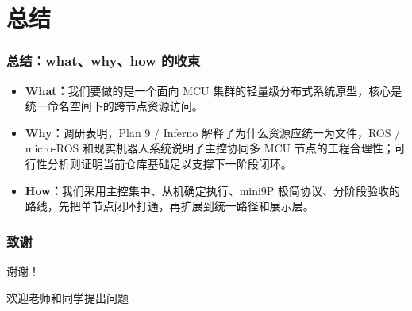 \documentclass[aspectratio=169]{ctexbeamer}
\begin{document}
\section{总结}

\begin{frame}
  \frametitle{总结：what、why、how 的收束}
  \begin{itemize}
    \item \textbf{What：}我们要做的是一个面向 MCU 集群的轻量级分布式系统原型，核心是统一命名空间下的跨节点资源访问。
    \item \textbf{Why：}调研表明，Plan 9 / Inferno 解释了为什么资源应统一为文件，ROS / micro-ROS 和现实机器人系统说明了主控协同多 MCU 节点的工程合理性；可行性分析则证明当前仓库基础足以支撑下一阶段闭环。
    \item \textbf{How：}我们采用主控集中、从机确定执行、mini9P 极简协议、分阶段验收的路线，先把单节点闭环打通，再扩展到统一路径和展示层。
  \end{itemize}
\end{frame}

\begin{frame}
  \frametitle{致谢}
  \centerline{\Large 谢谢！}
  \vspace{0.4cm}
  \centerline{\normalsize 欢迎老师和同学提出问题}
\end{frame}
\end{document}
